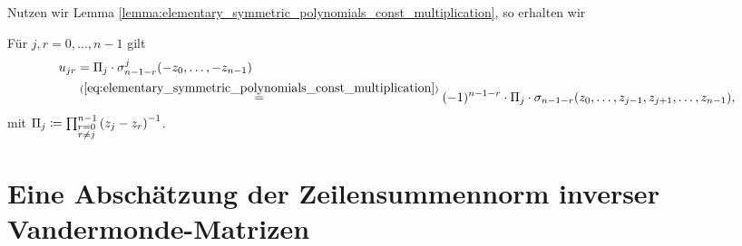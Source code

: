 \noindent Nutzen wir Lemma
\ref{lemma:elementary_symmetric_polynomials_const_multiplication}, so erhalten
wir
\begin{lemma}
    Für $j, r = 0, \dots, n-1$ gilt
    \begin{equation}
        \label{eq:explicit_inverse_vandermonde}
        \begin{split}
            u_{jr}
            &= \Pi_j \cdot \sigma_{n-1-r}^{j}(-z_0, \dots, -z_{n-1})\\
            &\overset{(\ref{eq:elementary_symmetric_polynomials_const_multiplication})}{=}
                (-1)^{n-1-r} \cdot \Pi_j \cdot \sigma_{n-1-r}(z_0, \dots, z_{j-1}, z_{j+1}, \dots, z_{n-1}),
        \end{split}
    \end{equation}
    mit $\Pi_j \coloneqq \prod_{\substack{r=0\\ r \neq j}}^{n-1} \left( z_j - z_r \right)^{-1}$.
\end{lemma}

\section{Eine Abschätzung der Zeilensummennorm inverser Vandermonde-Matrizen}

